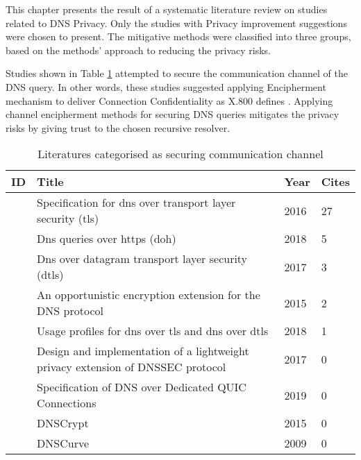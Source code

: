 This chapter presents the result of a systematic literature review on studies related to DNS Privacy. Only the studies with Privacy improvement suggestions were chosen to present.
The mitigative methods were classified into three groups, based on the methods' approach to reducing the privacy risks.

Studies shown in Table \ref{channel} attempted to secure the communication channel of the DNS query.
In other words, these studies suggested applying Encipherment mechanism to deliver Connection Confidentiality as X.800 defines \cite{x800}.
Applying channel encipherment methods for securing DNS queries mitigates the privacy risks by giving trust to the chosen recursive resolver.

\begin{table}[h!]
    \begin{tabular}{ | l | p{10.5cm} | l | l | }
        \hline
            ID & Title & Year & Cites  \\ \hline
            \cite{hu2016specification} & Specification for dns over transport layer security (tls) & 2016 & 27 \\ \hline
            \cite{rfc8484} & Dns queries over https (doh) & 2018 & 5\\ \hline
            \cite{rfc8094} & Dns over datagram transport layer security (dtls) & 2017 & 3\\ \hline
            \cite{bucuti2015opportunistic} & An opportunistic encryption extension for the DNS protocol & 2015 & 2 \\ \hline
            \cite{dickinson2018usage} & Usage profiles for dns over tls and dns over dtls & 2018 & 1 \\ \hline
            \cite{saraj2017design} & Design and implementation of a lightweight privacy extension of DNSSEC protocol & 2017 & 0 \\ \hline
            \cite{dnsoquic} & Specification of DNS over Dedicated QUIC Connections & 2019 & 0 \\ \hline
            \cite{denis2015dnscrypt} & DNSCrypt & 2015 & 0 \\ \hline
            \cite{dempsky2010dnscurve} & DNSCurve & 2009 & 0 \\ \hline
        \end{tabular}
        \caption{Literatures categorised as securing communication channel}
\label{channel}
\end{table}

